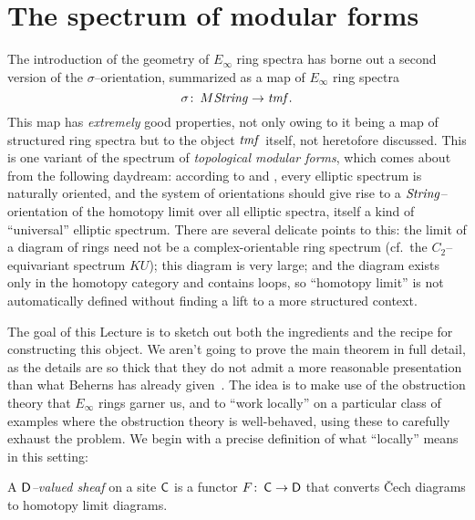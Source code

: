 \section{The spectrum of modular forms}\label{ConstructionOfTMFSection}

The introduction of the geometry of $E_\infty$ ring spectra has borne out a second version of the $\sigma$--orientation, summarized as a map of $E_\infty$ ring spectra \[\sigma\colon\thinspace M\mathit{String} \to \mathit{tmf}.\]  This map has \emph{extremely} good properties, not only owing to it being a map of structured ring spectra but to the object $\mathit{tmf}$ itself, not heretofore discussed.  This is one variant of the spectrum of \textit{topological modular forms}, which comes about from the following daydream: according to  and , every elliptic spectrum is naturally oriented, and the system of orientations should give rise to a $\mathit{String}$--orientation of the homotopy limit over all elliptic spectra, itself a kind of ``universal'' elliptic spectrum.  There are several delicate points to this: the limit of a diagram of rings need not be a complex-orientable ring spectrum (cf.\ the $C_2$--equivariant spectrum $KU$); this diagram is very large; and the diagram exists only in the homotopy category and contains loops, so ``homotopy limit'' is not automatically defined without finding a lift to a more structured context.

The goal of this Lecture is to sketch out both the ingredients and the recipe for constructing this object.  We aren't going to prove the main theorem in full detail, as the details are so thick that they do not admit a more reasonable presentation than what Beherns has already given~\cite{BehrensConstruction}.  The idea is to make use of the obstruction theory that $E_\infty$ rings garner us, and to ``work locally'' on a particular class of examples where the obstruction theory is well-behaved, using these to carefully exhaust the problem.  We begin with a precise definition of what ``locally'' means in this setting:

\begin{definition}
A \textit{$\mathsf{D}$--valued sheaf} on a site $\mathsf{C}$ is a functor $F\colon\thinspace \mathsf{C} \to \mathsf{D}$ that converts \v{C}ech diagrams to homotopy limit diagrams.
\end{definition}

